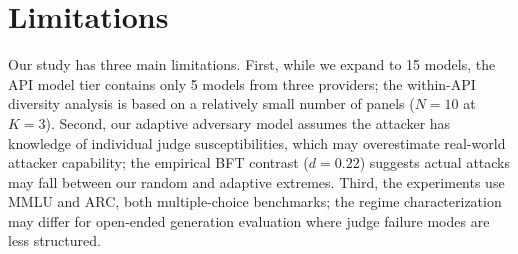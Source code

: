\documentclass[11pt]{article}
\begin{document}
\section*{Limitations}

Our study has three main limitations.
First, while we expand to 15 models, the API model tier contains only 5 models from three providers; the within-API diversity analysis is based on a relatively small number of panels ($N=10$ at $K=3$).
Second, our adaptive adversary model assumes the attacker has knowledge of individual judge susceptibilities, which may overestimate real-world attacker capability; the empirical BFT contrast ($d = 0.22$) suggests actual attacks may fall between our random and adaptive extremes.
Third, the experiments use MMLU and ARC, both multiple-choice benchmarks; the regime characterization may differ for open-ended generation evaluation where judge failure modes are less structured.



\end{document}

